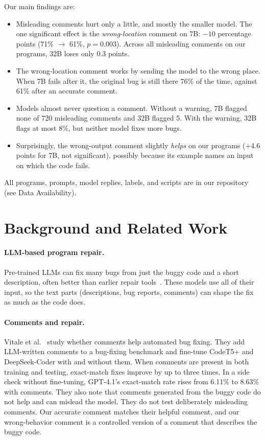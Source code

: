 \documentclass[sigconf,nonacm]{acmart}
\begin{document}
Our main findings are:
\begin{itemize}
\item Misleading comments hurt only a little, and mostly the smaller model. The one significant effect is the \emph{wrong-location} comment on 7B: $-10$ percentage points (71\% $\to$ 61\%, $p = 0.003$). Across all misleading comments on our programs, 32B loses only 0.3 points.
\item The wrong-location comment works by sending the model to the wrong place. When 7B fails after it, the original bug is still there 76\% of the time, against 61\% after an accurate comment.
\item Models almost never question a comment. Without a warning, 7B flagged none of 720 misleading comments and 32B flagged 5. With the warning, 32B flags at most 8\%, but neither model fixes more bugs.
\item Surprisingly, the wrong-output comment slightly \emph{helps} on our programs (+4.6 points for 7B, not significant), possibly because its example names an input on which the code fails.
\end{itemize}

All programs, prompts, model replies, labels, and scripts are in our repository (see Data Availability).

\section{Background and Related Work}
\label{sec:related}

\paragraph{LLM-based program repair.}
Pre-trained LLMs can fix many bugs from just the buggy code and a short description, often better than earlier repair tools~\cite{xia2023apr}. These models use all of their input, so the text parts (descriptions, bug reports, comments) can shape the fix as much as the code does.

\paragraph{Comments and repair.}
Vitale et al.~\cite{vitale2026comments} study whether comments help automated bug fixing. They add LLM-written comments to a bug-fixing benchmark and fine-tune CodeT5+ and DeepSeek-Coder with and without them. When comments are present in both training and testing, exact-match fixes improve by up to three times. In a side check without fine-tuning, GPT-4.1's exact-match rate rises from 6.11\% to 8.63\% with comments. They also note that comments generated from the buggy code do not help and can mislead the model. They do not test deliberately misleading comments. Our accurate comment matches their helpful comment, and our wrong-behavior comment is a controlled version of a comment that describes the buggy code.
\end{document}
